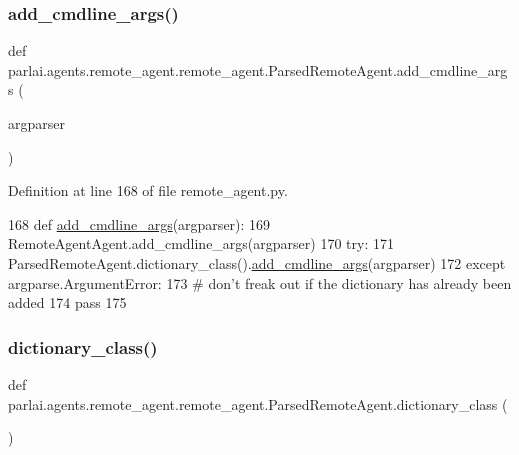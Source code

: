 \subsubsection{\texorpdfstring{add\+\_\+cmdline\+\_\+args()}{add\_cmdline\_args()}}
{\footnotesize\ttfamily def parlai.\+agents.\+remote\+\_\+agent.\+remote\+\_\+agent.\+Parsed\+Remote\+Agent.\+add\+\_\+cmdline\+\_\+args (\begin{DoxyParamCaption}\item[{}]{argparser }\end{DoxyParamCaption})\hspace{0.3cm}{\ttfamily [static]}}



Definition at line 168 of file remote\+\_\+agent.\+py.


\begin{DoxyCode}
168     \textcolor{keyword}{def }\hyperlink{namespaceparlai_1_1agents_1_1drqa_1_1config_a62fdd5554f1da6be0cba185271058320}{add\_cmdline\_args}(argparser):
169         RemoteAgentAgent.add\_cmdline\_args(argparser)
170         \textcolor{keywordflow}{try}:
171             ParsedRemoteAgent.dictionary\_class().\hyperlink{namespaceparlai_1_1agents_1_1drqa_1_1config_a62fdd5554f1da6be0cba185271058320}{add\_cmdline\_args}(argparser)
172         \textcolor{keywordflow}{except} argparse.ArgumentError:
173             \textcolor{comment}{# don't freak out if the dictionary has already been added}
174             \textcolor{keywordflow}{pass}
175 
\end{DoxyCode}
\mbox{\label{classparlai_1_1agents_1_1remote__agent_1_1remote__agent_1_1ParsedRemoteAgent_a5759817c6b1d248a0b64861222745f62}} 
\subsubsection{\texorpdfstring{dictionary\+\_\+class()}{dictionary\_class()}}
{\footnotesize\ttfamily def parlai.\+agents.\+remote\+\_\+agent.\+remote\+\_\+agent.\+Parsed\+Remote\+Agent.\+dictionary\+\_\+class (\begin{DoxyParamCaption}{ }\end{DoxyParamCaption})\hspace{0.3cm}{\ttfamily [static]}}



